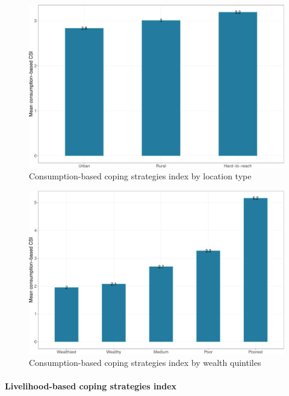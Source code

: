 \documentclass[12pt,a4paper]{article}
\let\oldparagraph\paragraph
\renewcommand{\paragraph}[1]{\oldparagraph{#1}\mbox{}}
\begin{document}
\begin{figure}[H]

{\centering \includegraphics{kayahReport_files/figure-latex/ccsi1plot-1} 

}

\caption{Consumption-based coping strategies index by location type}\label{fig:ccsi1plot}
\end{figure}

\begin{figure}[H]

{\centering \includegraphics{kayahReport_files/figure-latex/ccsi2plot-1} 

}

\caption{Consumption-based coping strategies index by wealth quintiles}\label{fig:ccsi2plot}
\end{figure}

\hypertarget{lcsi-results}{%
\paragraph{Livelihood-based coping strategies index}\label{lcsi-results}}
\end{document}
